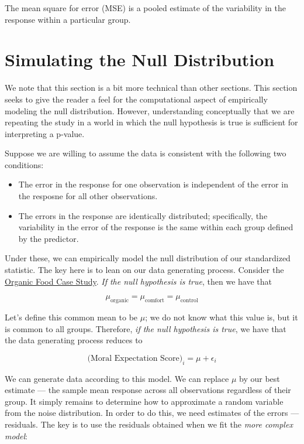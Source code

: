 \documentclass[]{book}
\providecommand{\tightlist}{%
  \setlength{\itemsep}{0pt}\setlength{\parskip}{0pt}}
\theoremstyle{plain}
\theoremstyle{mydefn}
\theoremstyle{myexmpl}
\theoremstyle{remark}
\let\BeginKnitrBlock\begin \let\EndKnitrBlock\end
\let\BeginKnitrBlock\begin \let\EndKnitrBlock\end
\begin{document}
\BeginKnitrBlock{rmdtip}
The mean square for error (MSE) is a pooled estimate of the variability
in the response within a particular group.
\EndKnitrBlock{rmdtip}

\section{Simulating the Null
Distribution}\label{simulating-the-null-distribution}

We note that this section is a bit more technical than other sections.
This section seeks to give the reader a feel for the computational
aspect of empirically modeling the null distribution. However,
understanding conceptually that we are repeating the study in a world in
which the null hypothesis is true is sufficient for interpreting a
p-value.

Suppose we are willing to assume the data is consistent with the
following two conditions:

\begin{itemize}
\tightlist
\item
  The error in the response for one observation is independent of the
  error in the resposne for all other observations.\\
\item
  The errors in the response are identically distributed; specifically,
  the variability in the error of the response is the same within each
  group defined by the predictor.
\end{itemize}

Under these, we can empirically model the null distribution of our
standardized statistic. The key here is to lean on our data generating
process. Consider the \protect\hyperlink{CaseOrganic}{Organic Food Case
Study}. \emph{If the null hypothesis is true}, then we have that

\[\mu_{\text{organic}} = \mu_{\text{comfort}} = \mu_{\text{control}}\]

Let's define this common mean to be \(\mu\); we do not know what this
value is, but it is common to all groups. Therefore, \emph{if the null
hypothesis is true}, we have that the data generating process reduces to

\begin{equation}
  \text{(Moral Expectation Score)}_i = \mu + \epsilon_i
  \label{eq:null-model}
\end{equation}

We can generate data according to this model. We can replace \(\mu\) by
our best estimate --- the sample mean response across all observations
regardless of their group. It simply remains to determine how to
approximate a random variable from the noise distribution. In order to
do this, we need estimates of the errors --- residuals. The key is to
use the residuals obtained when we fit the \emph{more complex model}:
\end{document}
